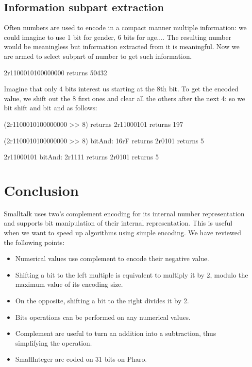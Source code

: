 \documentclass[a4paper,10pt,twoside]{book}
\begin{document}
\subsection*{Information subpart extraction}
Often numbers are used to encode in a compact manner multiple information: we could imagine to use 1 bit for gender, 6 bits for age.... The resulting number would be meaningless but information extracted from it is meaningful.
Now we are armed to select subpart of number to get such information. 

\begin{code}{}
2r1100010100000000 
	returns 50432
\end{code}

Imagine that only 4 bits interest us starting at the 8th bit.
To get the encoded value, we shift out the 8 first ones and clear all the others after the next 4: so we bit shift and bit and as follows:

\begin{code}{}
(2r1100010100000000 >> 8)
	returns 2r11000101
	returns 197

(2r1100010100000000 >> 8) bitAnd: 16rF	
	returns 2r0101	
	returns 5
	
2r11000101 bitAnd: 2r1111
	returns 2r0101	
	returns 5
\end{code}

\section{Conclusion}

Smalltalk uses two's complement encoding for its internal number representation and supports  bit manipulation of their internal representation. This is useful when we want to speed up algorithms using simple encoding. We have reviewed the following points:

\begin{itemize}
\item Numerical values use complement to encode their negative value.
\item Shifting a bit to the left multiple is equivalent to multiply it by 2, modulo the maximum value of its encoding size.
\item On the opposite, shifting a bit to the right divides it by 2.
\item Bits operations can be performed on any numerical values.
\item Complement are useful to turn an addition into a subtraction, thus simplifying the operation.
\item SmallInteger are coded on 31 bits on Pharo.
\end{itemize}

\ifx\wholebook\relax\else
   
   
\end{document}
